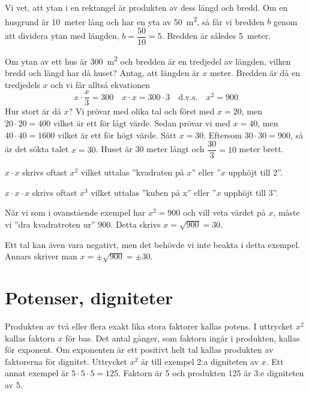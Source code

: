 \begin{tcolorbox}[enhanced jigsaw,breakable,title=Exempel]
Vi vet, att ytan i en rektangel är produkten av dess längd och bredd.
Om en husgrund är 10~meter lång och har en yta av \qty{50}{\square\metre}, så får
vi bredden \(b\) genom att dividera ytan med längden, \(b = \dfrac{50}{10} = 5\).
Bredden är således 5~meter.

Om ytan av ett hus är \qty{300}{\square\metre} och bredden är en tredjedel av
längden, vilken bredd och längd har då huset?
Antag, att längden är \(x\) meter.
Bredden är då en tredjedels \(x\) och vi får alltså ekvationen
%
\[
x \cdot \frac{x}{3} = 300 \quad
x \cdot x = 300 \cdot 3 \quad \text{d.v.s.}
\quad x^2 = 900
\]
%
Hur stort är då \(x\)?
Vi prövar med olika tal och först med \(x = 20\), men \(20 \cdot 20 = 400\)
vilket är ett för lågt värde.
Sedan prövar vi med \(x = 40\), men \(40 \cdot 40 = 1600\) vilket är ett för
högt värde.
Sätt \(x = 30\). Eftersom \(30 \cdot 30 = 900\), så är det sökta talet
\(x = 30\).
Huset är 30 meter långt och \(\dfrac{30}{3} = 10\) meter brett.
\end{tcolorbox}

\(x \cdot x\) skrivs oftast \(x^2\) vilket uttalas ''kvadraten på \(x\)''
eller ''\(x\) upphöjt till 2''.

\(x \cdot x \cdot x\) skrivs oftast \(x^3\) vilket uttalas ''kuben på x''
eller ''\(x\) upphöjt till 3''.

När vi som i ovanstående exempel har \(x^2 = 900\) och vill veta värdet på
\(x\), måste vi ''dra kvadratroten ur'' \(900\).
Detta skrivs \(x = \sqrt{900} = 30\).

Ett tal kan även vara negativt, men det behövde vi inte beakta i detta exempel.
Annars skriver man \(x = \pm \sqrt{900} = \pm 30\).

\section{Potenser, digniteter}
\label{potenser}

Produkten av två eller flera exakt lika stora faktorer kallas potens.
I uttrycket \(x^2\) kallas faktorn \(x\) för bas. Det antal gånger, som faktorn
ingår i produkten, kallas för exponent.
Om exponenten är ett positivt helt tal kallas produkten av faktorerna för
dignitet.
Uttrycket \(x^2\) är till exempel 2:a digniteten av \(x\).
Ett annat exempel är \(5 \cdot 5 \cdot 5 = 125\).
Faktorn är 5 och produkten 125 är 3:e digniteten av 5.

